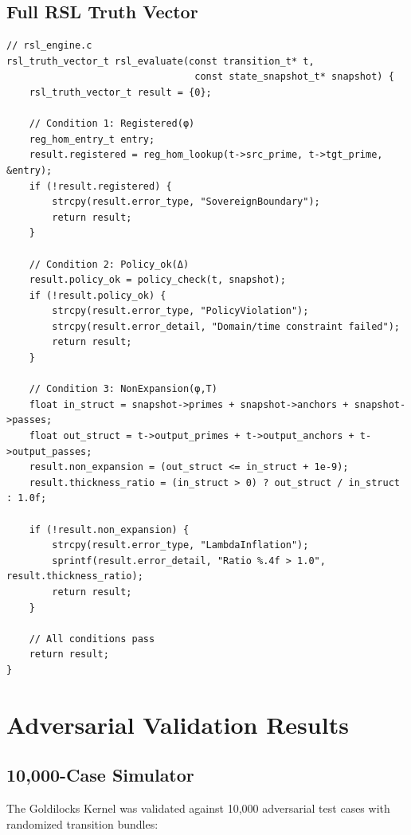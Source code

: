 \documentclass[11pt,a4paper]{article}
\begin{document}
\subsection{Full RSL Truth Vector}

\begin{lstlisting}[caption={RSL 3-Condition Evaluation}, label=lst:rsl]
// rsl_engine.c
rsl_truth_vector_t rsl_evaluate(const transition_t* t, 
                                 const state_snapshot_t* snapshot) {
    rsl_truth_vector_t result = {0};
    
    // Condition 1: Registered(φ)
    reg_hom_entry_t entry;
    result.registered = reg_hom_lookup(t->src_prime, t->tgt_prime, &entry);
    if (!result.registered) {
        strcpy(result.error_type, "SovereignBoundary");
        return result;
    }
    
    // Condition 2: Policy_ok(Δ)
    result.policy_ok = policy_check(t, snapshot);
    if (!result.policy_ok) {
        strcpy(result.error_type, "PolicyViolation");
        strcpy(result.error_detail, "Domain/time constraint failed");
        return result;
    }
    
    // Condition 3: NonExpansion(φ,T)
    float in_struct = snapshot->primes + snapshot->anchors + snapshot->passes;
    float out_struct = t->output_primes + t->output_anchors + t->output_passes;
    result.non_expansion = (out_struct <= in_struct + 1e-9);
    result.thickness_ratio = (in_struct > 0) ? out_struct / in_struct : 1.0f;
    
    if (!result.non_expansion) {
        strcpy(result.error_type, "LambdaInflation");
        sprintf(result.error_detail, "Ratio %.4f > 1.0", result.thickness_ratio);
        return result;
    }
    
    // All conditions pass
    return result;
}
\end{lstlisting}

\section{Adversarial Validation Results}

\subsection{10,000-Case Simulator}

The Goldilocks Kernel was validated against 10,000 adversarial test cases with randomized transition bundles:
\end{document}

